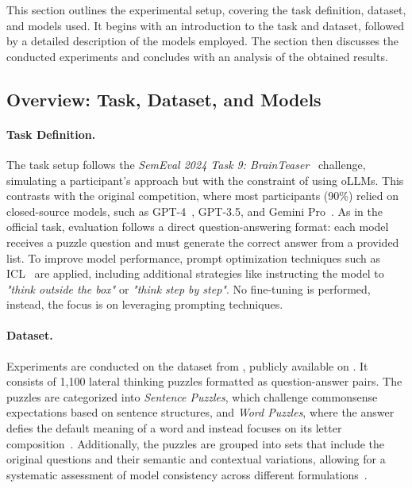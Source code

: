 This section outlines the experimental setup, covering the task definition, dataset, and models used. It begins with an introduction to the task and dataset, followed by a detailed description of the models employed. The section then discusses the conducted experiments and concludes with an analysis of the obtained results.

\subsection{Overview: Task, Dataset, and Models}

\paragraph{Task Definition.}
The task setup follows the \textit{SemEval 2024 Task 9: BrainTeaser}~\cite{jiangBRAINTEASERLateralThinking2023} challenge, simulating a participant's approach but with the constraint of using \acp{oLLM}. This contrasts with the original competition, where most participants (90\%) relied on closed-source models, such as \acs{GPT}-4~\cite{openaiGPT4TechnicalReport2024}, \acs{GPT}-3.5, and Gemini Pro~\cite{teamGeminiFamilyHighly2024}. As in the official task, evaluation follows a direct question-answering format: each model receives a puzzle question and must generate the correct answer from a provided list. To improve model performance, prompt optimization techniques such as \ac{ICL}~\cite{brownLanguageModelsAre2020} are applied, including additional strategies like instructing the model to \textit{"think outside the box"} or \textit{"think step by step"}. No fine-tuning is performed, instead, the focus is on leveraging prompting techniques.

\paragraph{Dataset.}
Experiments are conducted on the dataset from , publicly available on . It consists of 1,100 lateral thinking puzzles formatted as question-answer pairs. The puzzles are categorized into \textit{Sentence Puzzles}, which challenge commonsense expectations based on sentence structures, and \textit{Word Puzzles}, where the answer defies the default meaning of a word and instead focuses on its letter composition~\cite{jiangBRAINTEASERLateralThinking2023}. Additionally, the puzzles are grouped into sets that include the original questions and their semantic and contextual variations, allowing for a systematic assessment of model consistency across different formulations~\cite{jiangBRAINTEASERLateralThinking2023}.

